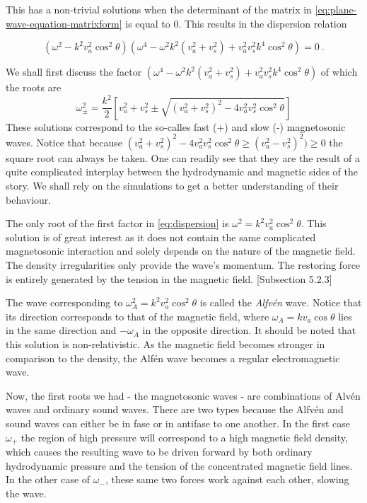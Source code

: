 This has a non-trivial solutions when the determinant of the matrix in \cref{eq:plane-wave-equation-matrixform} is equal to $0$. This results in the dispersion relation

\begin{equation}
\label{eq:dispersion}
(\omega^2 - k^2 v_a^2\cos^2\theta)\left( \omega^4 - \omega^2k^2(v_a^2+v_s^2) + v_a^2 v_s^2k^4\cos^2\theta  \right) = 0 \ .
\end{equation}


\noindent We shall first discuss the factor $\left( \omega^4 - \omega^2k^2(v_a^2+v_s^2) + v_a^2 v_s^2k^4\cos^2\theta  \right)$
of which the roots are
\begin{equation}
	\omega_{\pm}^2 = \frac{k^2}{2} \left[ v_a^2+v_s^2 \pm \sqrt{(v_a^2+v_s^2)^2-4v_a^2v_s^2\cos^2\theta} \right] 	
	\label{eq:magnetosonic-phase-speed}
\end{equation}
These solutions correspond to the so-calles fast (+) and slow (-) magnetosonic waves. 
Notice that because $(v_a^2+v_s^2)^2-4v_a^2v_s^2\cos^2\theta \geq (v_a^2-v_s^2)^2) \geq 0$ the square root can always be taken.
One can readily see that they are the result of a quite complicated interplay between the hydrodynamic and magnetic sides of the story. 
We shall rely on the simulations to get a better understanding of their behaviour.

The only root of the first factor in \cref{eq:dispersion} is $ \omega^2 = k^2 v_a^2\cos^2\theta$. 
This solution is of great interest as it does not contain the same complicated magnetosonic interaction and solely depends on the nature of the magnetic field. 
The density irregularities only provide the wave's momentum. The restoring force is entirely generated by the tension in the magnetic field. \cite{notes-principles-MHD}[Subsection 5.2.3]

The wave corresponding to $\omega_A^2 = k^2 v_a^2\cos^2\theta$ is called the \textit{Alfvén} wave. 
Notice that its direction corresponds to that of the magnetic field, where $\omega_A = k v_a\cos\theta$ lies in the same direction and $-\omega_A$ in the opposite direction. 
It should be noted that this solution is non-relativistic. 
As the magnetic field becomes stronger in comparison to the density, the Alfén wave becomes a regular electromagnetic wave.

Now, the first roots we had - the magnetosonic waves - are combinations of Alvén waves and ordinary sound waves. 
There are two types because the Alfvén and sound waves can either be in fase or in antifase to one another. 
In the first case $\omega_+$ the region of high pressure will correspond to a high magnetic field density, which causes the resulting wave to be driven forward by both ordinary hydrodynamic pressure and the tension of the concentrated magnetic field lines. 
In the other case of $\omega_-$, these same two forces work against each other, slowing the wave.

